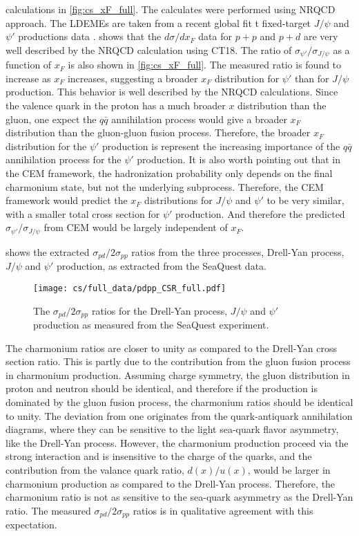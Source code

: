 \documentclass[../main.tex]{subfiles}
\begin{document}
calculations in \cref{fig:cs_xF_full}. The calculates were performed using NRQCD approach.
The LDEMEs are taken from a recent global fit t fixed-target $J/\psi$ and $\psi'$ productions data \cite{hsieh2021,chang2023}.
 shows that the $d\sigma/dx_F$ data for $p+p$ and $p+d$ are very well described
by the NRQCD calculation using CT18. The ratio of $\sigma_{\psi'}/\sigma_{J/\psi}$ as a function of $x_F$
is also shown in \cref{fig:cs_xF_full}. The measured ratio is found to increase as $x_F$ increases,
suggesting a broader $x_F$ distribution for $\psi'$ than for $J/\psi$ production. 
This behavior is well described by the NRQCD calculations.
Since the valence quark in the proton has a much broader $x$ distribution than the gluon,
one expect the $q\bar{q}$ annihilation process would give a broader $x_F$ distribution than the
gluon-gluon fusion process. Therefore, the broader $x_F$ distribution for the $\psi'$ production
is represent the increasing importance of the $q\bar{q}$ annihilation process for the $\psi'$
production.
It is also worth pointing out that in the CEM framework, the hadronization probability only depends on
the final charmonium state, but not the underlying subprocess. Therefore, the CEM framework would predict
the $x_F$ distributions for $J/\psi$ and $\psi'$ to be very similar, with a smaller total cross section
for $\psi'$ production. And therefore the predicted $\sigma_{\psi'}/\sigma_{J/\psi}$ from CEM would be
largely independent of $x_F$.

 shows the extracted $\sigma_{pd}/2\sigma_{pp}$ ratios from the three processes,
Drell-Yan process, $J/\psi$ and $\psi'$ production, as extracted from the SeaQuest data.
\begin{figure}[h!]
	\centering
	\texttt{[image: cs/full\_data/pdpp\_CSR\_full.pdf]}
	\caption{The $\sigma_{pd}/2\sigma_{pp}$ ratios for the Drell-Yan process, $J/\psi$ and $\psi'$ production
		as measured from the SeaQuest experiment.
	}
	\label{fig:csr_all_process}
\end{figure}
The charmonium ratios are closer to unity as compared to the Drell-Yan cross section ratio. This
is partly due to the contribution from the gluon fusion process in charmonium production. Assuming
charge symmetry, the gluon distribution in proton and neutron should be identical, and therefore
if the production is dominated by the gluon fusion process, the charmonium ratios should be identical
to unity. The deviation from one originates from the quark-antiquark annihilation diagrams, where they
can be sensitive to the light sea-quark flavor asymmetry, like the Drell-Yan process. However, the charmonium
production proceed via the strong interaction and is insensitive to the charge of the quarks, and
the contribution from the valance quark ratio, $d(x)/u(x)$, would be larger in charmonium production as compared to the Drell-Yan process.
Therefore, the charmonium ratio is not as sensitive to the sea-quark asymmetry as the Drell-Yan ratio.
The measured $\sigma_{pd}/2\sigma_{pp}$ ratios is in qualitative agreement with this expectation.
\end{document}
